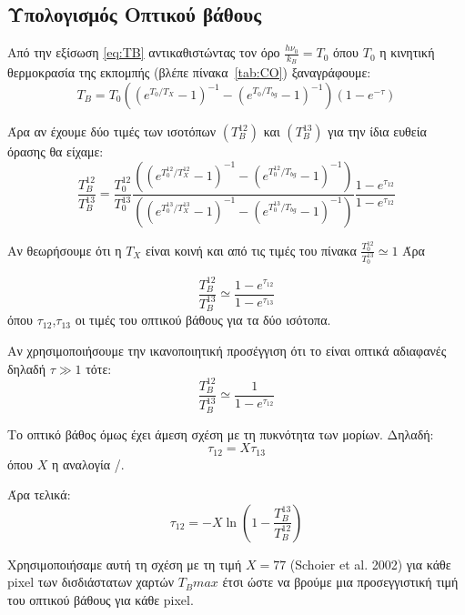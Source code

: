 \documentclass[a4paper,12pt]{memoir}
\begin{document}
\subsection{Υπολογισμός Οπτικού βάθους}
Από την εξίσωση \ref{eq:TB} αντικαθιστώντας τον όρο $\frac{h \nu _0}{k_B}=T_0$ όπου $T_0$ η κινητική θερμοκρασία της εκπομπής (βλέπε πίνακα~\ref{tab:CO}) ξαναγράφουμε:
\begin{equation}
T_B=T_0 \left( (e^{T_0/T_X}-1)^{-1}-(e^{T_0/T_{bg}}-1)^{-1} \right) \left( 1-e^{-\tau}\right) 
\end{equation}

Άρα αν έχουμε δύο τιμές των ισοτόπων  $(T_B ^12)$ και  $(T_B ^13)$ για την ίδια ευθεία όρασης θα είχαμε:
\begin{equation}
\frac{T_B ^{12}}{T_B ^{13}}=\frac{T_0 ^{12}}{T_0 ^{13}}  
\frac{\left( (e^{T_0 ^{12}/T_X ^{12}}-1)^{-1}-(e^{T_0 ^{12}/T_{bg}}-1)^{-1} \right)}
{\left( (e^{T_0 ^{13}/T_X ^{13}}-1)^{-1}-(e^{T_0 ^{13}/T_{bg}}-1)^{-1} \right)} \frac{1-e^{\tau _{12}}}{1-e^{\tau _{12}}}
\end{equation}

Αν θεωρήσουμε ότι η $T_X$ είναι κοινή και από τις τιμές του πίνακα $\frac{T_0 ^{12}}{T_0 ^{13}} \simeq 1$
Άρα

\begin{equation}
\frac{T_B ^{12}}{T_B ^{13}} \simeq \frac{1-e^{\tau _{12}}}{1-e^{\tau _{13}}}
\end{equation}
όπου $\tau _{12}$,$\tau _{13}$ οι τιμές του οπτικού βάθους για τα δύο ισότοπα.

Αν χρησιμοποιήσουμε την ικανοποιητική προσέγγιση ότι το  είναι οπτικά αδιαφανές δηλαδή $\tau \gg 1$ τότε:
\begin{equation}
\frac{T_B ^{12}}{T_B ^{13}} \simeq \frac{1}{1-e^{\tau _{12}}}
\end{equation}

Το οπτικό βάθος όμως έχει άμεση σχέση με τη πυκνότητα των μορίων. Δηλαδή:
\begin{equation}
\tau _{12} = X \tau _{13}
\end{equation}
όπου $X$ η αναλογία /.

Άρα τελικά:
\begin{equation}
\tau _{12} = -X \ln \left( 1-\frac{T_B ^{13}}{T_B ^{12}} \right) 
\end{equation}

Χρησιμοποιήσαμε αυτή τη σχέση με τη τιμή $X=77$ (Schoier et al. 2002) για κάθε pixel των δισδιάστατων χαρτών $T_Bmax$ έτσι ώστε να βρούμε μια προσεγγιστική τιμή του οπτικού βάθους για κάθε pixel. 
\end{document}
